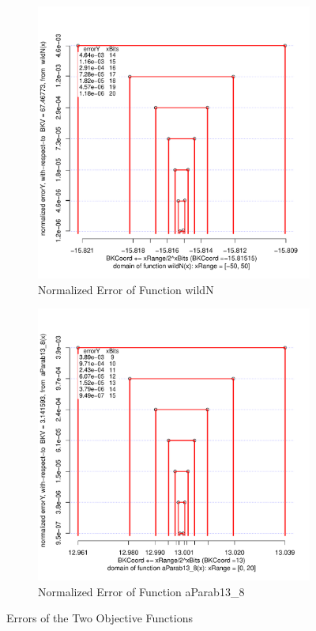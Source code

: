 \documentclass[11pt, oneside]{article}
\begin{document}
   \begin{figure}
   \centering
   \begin{subfigure}{.5\textwidth}
       \centering
       \includegraphics[width=1\linewidth]{fg_OF_wildN_quant_box.pdf}
       \caption{Normalized Error of Function wildN }
   \end{subfigure}%
   \begin{subfigure}{.5\textwidth}
      \centering
      \includegraphics[width=1\linewidth]{fg_OF_aParab13_8_quant_box.pdf}
      \caption{Normalized Error of Function aParab13\_8}
   \end{subfigure}
   \caption{Errors of the Two Objective Functions}
   \end{figure}
\end{document}

